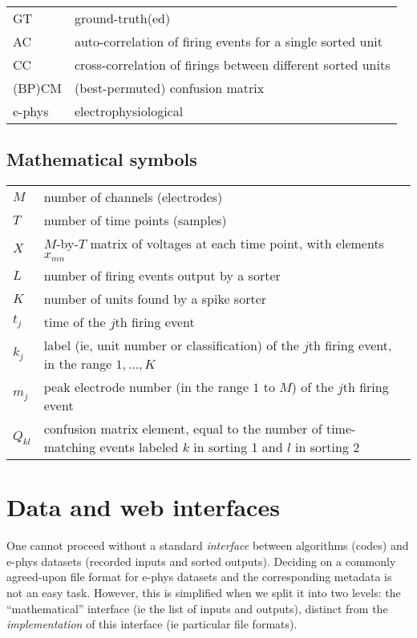 \documentclass[10pt]{article}
\begin{document}
\begin{tabular}{ll}
GT & ground-truth(ed)\\
AC & auto-correlation of firing events for a single sorted unit\\
CC & cross-correlation of firings between different sorted units\\
(BP)CM & (best-permuted) confusion matrix \cite{validspike}\\
e-phys & electrophysiological\\
\end{tabular}

\subsection{Mathematical symbols}
\label{s:symb}

\begin{tabular}{ll}
  $M$ & number of channels (electrodes)\\
  $T$ & number of time points (samples)\\
  $X$ & $M$-by-$T$ matrix of voltages at each time point, with elements $x_{mn}$\\
  $L$ & number of firing events output by a sorter\\
  $K$ & number of units found by a spike sorter\\
  $t_j$ & time of the $j$th firing event\\
  $k_j$ & label (ie, unit number or classification) of the $j$th firing event,
  in the range $1,\ldots,K$\\
  $m_j$ & peak electrode number (in the range $1$ to $M$) of the $j$th firing event\\
  $Q_{kl}$ & confusion matrix element, equal to the
  number of time-matching events labeled $k$ in sorting 1 and $l$ in sorting 2\\
\end{tabular}



\section{Data and web interfaces}

One cannot proceed without a
standard {\em interface} between algorithms (codes) and e-phys datasets
(recorded inputs and sorted outputs).
Deciding on a commonly agreed-upon file format for e-phys datasets and the corresponding metadata is not an easy task.
However, this is simplified when we split it into two levels:
the ``mathematical'' interface
(ie the list of inputs and outputs), distinct from the
{\em implementation} of this interface (ie particular file formats).
\end{document}
